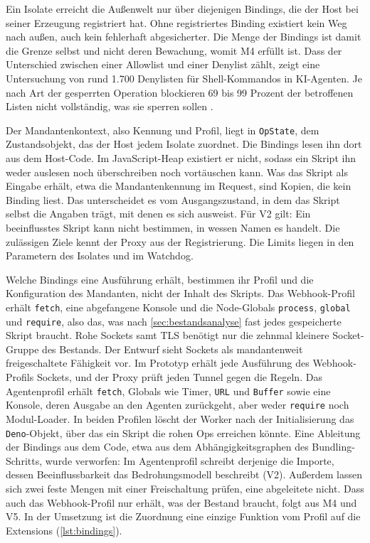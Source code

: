 Ein Isolate erreicht die Außenwelt nur über diejenigen Bindings, die der Host bei seiner Erzeugung registriert hat. Ohne
registriertes Binding existiert kein Weg nach außen, auch kein fehlerhaft abgesicherter. Die Menge der Bindings ist
damit die Grenze selbst und nicht deren Bewachung, womit M4 erfüllt ist. Dass der Unterschied zwischen
einer Allowlist und einer Denylist zählt, zeigt eine Untersuchung von rund 1.700 Denylisten für
Shell-Kommandos in \ac{KI}-Agenten. Je nach Art der gesperrten Operation blockieren 69 bis 99 Prozent der betroffenen Listen nicht vollständig, was sie sperren sollen \autocite[S.~1--2]{chen_one_2026}.

Der Mandantenkontext, also Kennung und Profil, liegt in \texttt{OpState}, dem Zustandsobjekt, das der
Host jedem Isolate zuordnet. Die Bindings lesen ihn dort aus dem Host-Code. Im JavaScript-Heap existiert er nicht,
sodass ein Skript ihn weder auslesen noch überschreiben noch vortäuschen kann. Was das Skript als Eingabe erhält,
etwa die Mandantenkennung im Request, sind Kopien, die kein Binding liest. Das unterscheidet es vom Ausgangszustand, in
dem das Skript selbst die Angaben trägt, mit denen es sich ausweist. Für V2 gilt: Ein beeinflusstes Skript kann nicht
bestimmen, in wessen Namen es handelt. Die zulässigen Ziele kennt der Proxy aus der Registrierung.
Die Limits liegen in den Parametern des Isolates und im Watchdog.

Welche Bindings eine Ausführung erhält, bestimmen ihr Profil und die Konfiguration des Mandanten, nicht der Inhalt des
Skripts. Das Webhook-Profil erhält \texttt{fetch}, eine abgefangene Konsole und die Node-Globals \texttt{process},
\texttt{global} und \texttt{require}, also das, was nach \autoref{sec:bestandsanalyse} fast jedes gespeicherte Skript
braucht. Rohe Sockets samt \ac{TLS} benötigt nur die zehnmal kleinere Socket-Gruppe des Bestands. Der Entwurf sieht Sockets
als mandantenweit freigeschaltete Fähigkeit vor. Im Prototyp erhält jede Ausführung des Webhook-Profils Sockets, und der
Proxy prüft jeden Tunnel gegen die Regeln. Das Agentenprofil erhält \texttt{fetch}, Globals wie Timer,
\texttt{URL} und \texttt{Buffer} sowie eine Konsole, deren Ausgabe an den Agenten zurückgeht, aber weder \texttt{require}
noch Modul-Loader. In beiden Profilen
löscht der Worker nach der Initialisierung das \texttt{Deno}-Objekt, über das ein Skript die rohen Ops erreichen
könnte. Eine
Ableitung der Bindings aus dem Code, etwa aus dem Abhängigkeitsgraphen des Bundling-Schritts, wurde verworfen: Im
Agentenprofil schreibt derjenige die Importe, dessen Beeinflussbarkeit das Bedrohungsmodell beschreibt (V2). Außerdem
lassen sich zwei feste Mengen mit einer Freischaltung prüfen, eine abgeleitete nicht. Dass auch das Webhook-Profil nur
erhält, was der Bestand braucht, folgt aus M4 und V5. In der Umsetzung ist die Zuordnung eine einzige Funktion vom
Profil auf die Extensions (\autoref{lst:bindings}).

